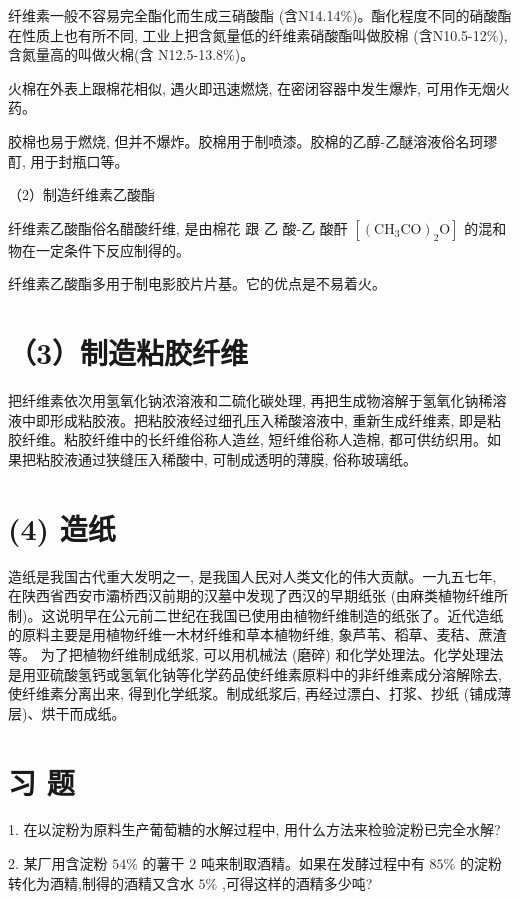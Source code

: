 \documentclass[10pt]{article}
\begin{document}
纤维素一般不容易完全酯化而生成三硝酸酯 (含N14.14\%)。酯化程度不同的硝酸酯在性质上也有所不同, 工业上把含氮量低的纤维素硝酸酯叫做胶棉 (含N10.5-12\%),含氮量高的叫做火棉(含 N12.5-13.8\%)。

火棉在外表上跟棉花相似, 遇火即迅速燃烧, 在密闭容器中发生爆炸, 可用作无烟火药。

胶棉也易于燃烧, 但并不爆炸。胶棉用于制喷漆。胶棉的乙醇-乙醚溶液俗名珂璆酊, 用于封瓶口等。

（2）制造纤维素乙酸酯

纤维素乙酸酯俗名醋酸纤维, 是由棉花 跟 乙 酸-乙 酸酐 \(\left\lbrack {{\left( {\mathrm{{CH}}}_{3}\mathrm{{CO}}\right) }_{2}\mathrm{O}}\right\rbrack\) 的混和物在一定条件下反应制得的。

纤维素乙酸酯多用于制电影胶片片基。它的优点是不易着火。

\section*{（3）制造粘胶纤维}

把纤维素依次用氢氧化钠浓溶液和二硫化碳处理, 再把生成物溶解于氢氧化钠稀溶液中即形成粘胶液。把粘胶液经过细孔压入稀酸溶液中, 重新生成纤维素, 即是粘胶纤维。粘胶纤维中的长纤维俗称人造丝, 短纤维俗称人造棉, 都可供纺织用。如果把粘胶液通过狭缝压入稀酸中, 可制成透明的薄膜, 俗称玻璃纸。

\section*{(4) 造纸}

造纸是我国古代重大发明之一, 是我国人民对人类文化的伟大贡献。一九五七年, 在陕西省西安市灞桥西汉前期的汉墓中发现了西汉的早期纸张 (由麻类植物纤维所制)。这说明早在公元前二世纪在我国已使用由植物纤维制造的纸张了。近代造纸的原料主要是用植物纤维一木材纤维和草本植物纤维, 象芦苇、稻草、麦秸、蔗渣等。 为了把植物纤维制成纸浆, 可以用机械法 (磨碎) 和化学处理法。化学处理法是用亚硫酸氢钙或氢氧化钠等化学药品使纤维素原料中的非纤维素成分溶解除去, 使纤维素分离出来, 得到化学纸浆。制成纸浆后, 再经过漂白、打浆、抄纸 (铺成薄层)、烘干而成纸。

\section*{习 题}

1. 在以淀粉为原料生产葡萄糖的水解过程中, 用什么方法来检验淀粉已完全水解?

2. 某厂用含淀粉 \({54}\%\) 的薯干 2 吨来制取酒精。如果在发酵过程中有 \({85}\%\) 的淀粉转化为酒精,制得的酒精又含水 \(5\%\) ,可得这样的酒精多少吨?
\end{document}

